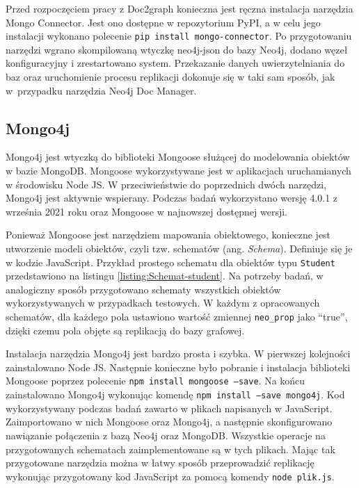 \documentclass[a4paper,twoside,12pt]{book}
\newcommand{\obcy}[1]{\emph{#1}}
\newcommand{\ang}[1]{{\selectlanguage{british}\obcy{#1}}}
\begin{document}
Przed rozpoczęciem pracy z Doc2graph konieczna jest ręczna instalacja narzędzia Mongo Connector. Jest ono dostępne w repozytorium PyPI, a w celu jego instalacji wykonano polecenie \texttt{pip install mongo-connector}. Po przygotowaniu narzędzi wgrano skompilowaną wtyczkę neo4j-json do bazy Neo4j, dodano węzeł konfiguracyjny i zrestartowano system. Przekazanie danych uwierzytelniania do baz oraz uruchomienie procesu replikacji dokonuje się w taki sam sposób, jak w~przypadku narzędzia Neo4j Doc Manager.

\subsection{Mongo4j}

Mongo4j jest wtyczką do biblioteki Mongoose służącej do modelowania obiektów w bazie MongoDB. Mongoose wykorzystywane jest w aplikacjach uruchamianych w środowisku Node JS. W przeciwieństwie do poprzednich dwóch narzędzi, Mongo4j jest aktywnie wspierany. Podczas badań wykorzystano wersję 4.0.1 z września 2021 roku oraz Mongoose w najnowszej dostępnej wersji. 

Ponieważ Mongoose jest narzędziem mapowania obiektowego, konieczne jest utworzenie modeli obiektów, czyli tzw. schematów (ang. \ang{Schema}). Definiuje się je w kodzie JavaScript. Przykład prostego schematu dla obiektów typu \lstinline{Student} przedstawiono na listingu \ref{listing:Schemat-student}. Na potrzeby badań, w analogiczny sposób przygotowano schematy wszystkich obiektów wykorzystywanych w przypadkach testowych. W każdym z opracowanych schematów, dla każdego pola ustawiono wartość zmiennej \texttt{neo\_prop} jako ``true'', dzięki czemu pola objęte są replikacją do bazy grafowej.

Instalacja narzędzia Mongo4j jest bardzo prosta i szybka. W pierwszej kolejności zainstalowano Node JS. Następnie konieczne było pobranie i instalacja biblioteki Mongoose poprzez polecenie \texttt{npm install mongoose --save}. Na końcu zainstalowano Mongo4j wykonując komendę \texttt{npm install --save mongo4j}. Kod wykorzystywany podczas badań zawarto w plikach napisanych w JavaScript. Zaimportowano w nich Mongoose oraz Mongo4j, a następnie skonfigurowano nawiązanie połączenia z bazą Neo4j oraz MongoDB. Wszystkie operacje na przygotowanych schematach zaimplementowane są w tych plikach. Mając tak przygotowane narzędzia można w łatwy sposób przeprowadzić replikację wykonując przygotowany kod JavaScript za pomocą komendy \texttt{node plik.js}. 
\end{document}
